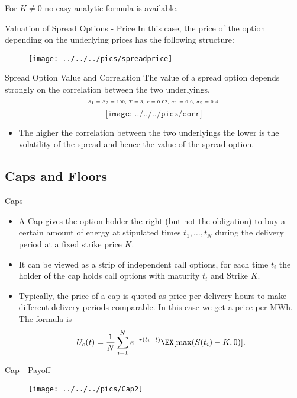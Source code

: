 For $K\neq 0$ no easy analytic formula is available.

{Valuation of Spread Options - Price}
In this case, the price of the option depending on the underlying prices has the following structure:
\begin{figure}
	\centering
		\texttt{[image: ../../../pics/spreadprice]}
	\label{fig:spreadprice}
\end{figure}

{Spread Option Value and Correlation}
The value of a spread option depends strongly on the correlation between the two underlyings.
$$\tiny\text{$S_1=S_2=100$, $T=3$, $r=0.02$, $\sigma_1=0.6$, $\sigma_2=0.4$.}$$
\vspace{-0.76cm}
$$\texttt{[image: ../../../pics/corr]}$$
\begin{itemize}
\vspace{-1cm}
\item The higher the correlation between the two underlyings the lower is the volatility of the spread and hence the value of the spread option.
\end{itemize}

\subsection{Caps and  Floors}

{Caps}
\begin{itemize}
\item<1->
A Cap gives the option holder the right (but not the
obligation) to buy a certain amount of energy at stipulated times
$t_1,\ldots,t_N$ during the delivery period at a fixed strike
price $K$.
\item<2->
It can be viewed as a strip of
independent call options, for each time $t_i$ the holder of the cap holds call options with maturity $t_i$ and Strike $K$.
\item<3->
Typically, the price of a cap is quoted as price per delivery hours to make
different delivery periods comparable. In this case we get a price
per MWh. The formula is
$$U_c(t)=\frac{1}{N}\sum_{i=1}^Ne^{-r(t_i-t)}\EX[\max(S(t_i)-K,0)].$$
\end{itemize}

{Cap - Payoff}
\begin{figure}
	\centering
		\texttt{[image: ../../../pics/Cap2]}
	\label{fig:Cap2}
\end{figure}

